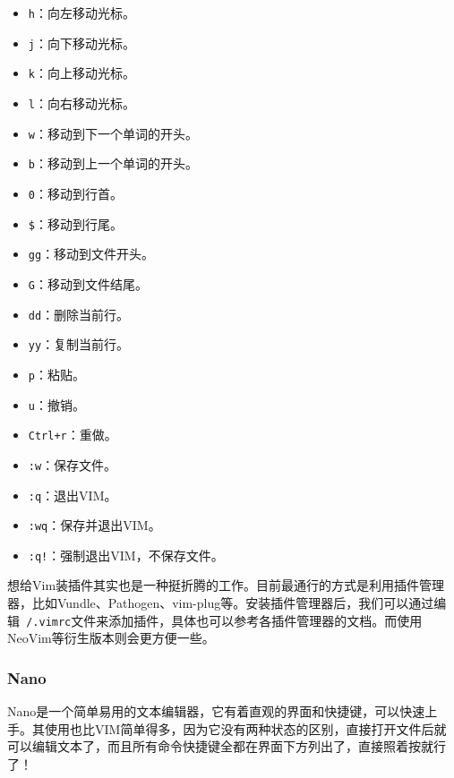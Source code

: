 \begin{multicols}{2}
  \begin{itemize}
    \item \texttt{h}：向左移动光标。
    \item \texttt{j}：向下移动光标。
    \item \texttt{k}：向上移动光标。
    \item \texttt{l}：向右移动光标。
    \item \texttt{w}：移动到下一个单词的开头。
    \item \texttt{b}：移动到上一个单词的开头。
    \item \texttt{0}：移动到行首。
    \item \texttt{\$}：移动到行尾。
    \item \texttt{gg}：移动到文件开头。
    \item \texttt{G}：移动到文件结尾。
    \item \texttt{dd}：删除当前行。
    \item \texttt{yy}：复制当前行。
    \item \texttt{p}：粘贴。
    \item \texttt{u}：撤销。
    \item \texttt{Ctrl+r}：重做。
    \item \texttt{:w}：保存文件。
    \item \texttt{:q}：退出VIM。
    \item \texttt{:wq}：保存并退出VIM。
    \item \texttt{:q!}：强制退出VIM，不保存文件。
  \end{itemize}
\end{multicols}

想给Vim装插件其实也是一种挺折腾的工作。目前最通行的方式是利用插件管理器，比如Vundle、Pathogen、vim-plug等。安装插件管理器后，我们可以通过编辑\texttt{~/.vimrc}文件来添加插件，具体也可以参考各插件管理器的文档。而使用NeoVim等衍生版本则会更方便一些。

\subsubsection{Nano}

Nano是一个简单易用的文本编辑器，它有着直观的界面和快捷键，可以快速上手。其使用也比VIM简单得多，因为它没有两种状态的区别，直接打开文件后就可以编辑文本了，而且所有命令快捷键全都在界面下方列出了，直接照着按就行了！

